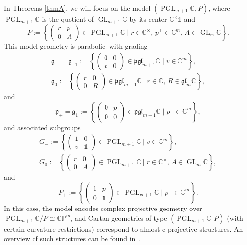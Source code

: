 \documentclass[pdftex]{sigma}
\numberwithin{equation}{section}
\theoremstyle{definition}
\DeclareMathOperator{\GLin}{\mathrm{GL}}
\DeclareMathOperator{\PGL}{\mathrm{PGL}}
\begin{document}
In Theorems \ref{thmA}, we will focus on the model $(\PGL_{m+1}\mathbb{C},P)$, where $\PGL_{m+1}\mathbb{C}$ is the quotient of $\GLin_{m+1}\mathbb{C}$ by its center $\mathbb{C}^\times\mathds{1}$ and \[P:=\left\{\begin{pmatrix}r & p \\ 0 & A\end{pmatrix}\in\PGL_{m+1}\mathbb{C}\mid r\in\mathbb{C}^\times,\,p^\top\in\mathbb{C}^m,\, A\in\GLin_m\mathbb{C}\right\}.\] This model geometry is parabolic, with grading
\begin{gather*}
\mathfrak{g}_-=\mathfrak{g}_{-1}:=\left\{\begin{pmatrix}0 & 0 \\ v & 0\end{pmatrix}\in\mathfrak{pgl}_{m+1}\mathbb{C}\mid v\in\mathbb{C}^m\right\},\\
\mathfrak{g}_0:=\left\{\begin{pmatrix}r & 0 \\ 0 & R\end{pmatrix}\in\mathfrak{pgl}_{m+1}\mathbb{C}\mid r\in\mathbb{C},\, R\in\mathfrak{gl}_m\mathbb{C}\right\},
\end{gather*}
 and \[\mathfrak{p}_+=\mathfrak{g}_1:=\left\{\begin{pmatrix}0 & p \\ 0 & 0\end{pmatrix}\in\mathfrak{pgl}_{m+1}\mathbb{C}\mid p^\top\in\mathbb{C}^m\right\},\] and associated subgroups
 \begin{gather*}
 G_-:=\left\{\begin{pmatrix}1 & 0 \\ v & \mathds{1}\end{pmatrix}\in\PGL_{m+1}\mathbb{C}\mid v\in\mathbb{C}^m\right\},\\ G_0:=\left\{\begin{pmatrix}r & 0 \\ 0 & A\end{pmatrix}\in\PGL_{m+1}\mathbb{C}\mid r\in\mathbb{C}^\times,\,  A\in\GLin_m\mathbb{C}\right\},
  \end{gather*}
  and \[P_+:=\left\{\begin{pmatrix}1 & p \\ 0 & \mathds{1}\end{pmatrix}\in\PGL_{m+1}\mathbb{C}\mid p^\top\in\mathbb{C}^m\right\}.\] In this case, the model encodes complex projective geometry over $\PGL_{m+1}\mathbb{C}/P\cong\mathbb{CP}^m$, and Cartan geometries of type $(\PGL_{m+1}\mathbb{C},P)$ (with certain curvature restrictions) correspond to almost c-projective structures. An overview of such structures can be found in~\cite{cprojCEMN}.
\end{document}
